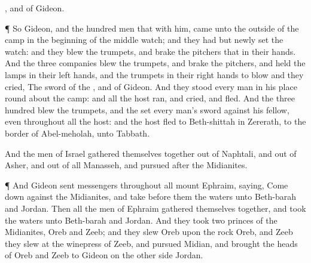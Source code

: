 {{}, and of
Gideon.
\par }{\PP {}¶ So
Gideon, and the
hundred
men that
{} with him,
came unto the
outside of the
camp in the
beginning of the
middle
watch; and they had
but
newly
set the
watch: and they
blew the
trumpets, and
brake the
pitchers that
{} in their
hands.
And the
three
companies
blew the
trumpets, and
brake the
pitchers, and
held the
lamps in their
left
hands, and the
trumpets in their
right
hands to
blow
{} and they
cried, The
sword of the
{}, and of
Gideon.
And they
stood every
man in his place round
about the
camp: and all the
host
ran, and
cried, and
fled.
And the
three
hundred
blew the
trumpets, and the
{}
set every
man’s
sword against his
fellow, even throughout all the
host: and the
host
fled to
Beth-shittah in
Zererath,
{} to the
border of
Abel-meholah, unto
Tabbath.
\par }{\PP {}And the
men of
Israel gathered themselves
together out of
Naphtali, and out of
Asher, and out of all
Manasseh, and
pursued
after the
Midianites.
\par }{\PP {}¶ And
Gideon
sent
messengers throughout all
mount
Ephraim,
saying, Come
down
against the
Midianites, and
take before them the
waters unto
Beth-barah and
Jordan. Then all the
men of
Ephraim gathered themselves
together, and
took the
waters unto
Beth-barah and
Jordan.
And they
took
two
princes of the
Midianites,
Oreb and
Zeeb; and they
slew
Oreb upon the
rock
Oreb, and
Zeeb they
slew at the
winepress of
Zeeb, and
pursued
Midian, and
brought the
heads of
Oreb and
Zeeb to
Gideon on the other
side
Jordan.

}
